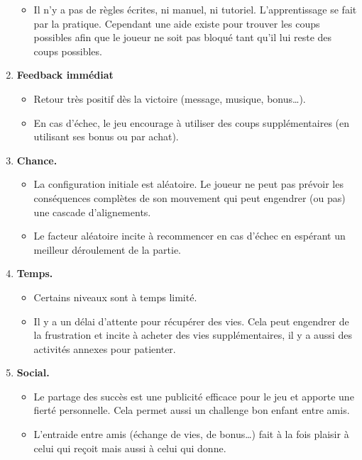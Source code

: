 \documentclass[11pt,class=report,crop=false]{standalone}
\begin{document}
\begin{enumerate}
\begin{itemize}
		\item Il n'y a pas de règles écrites, ni manuel, ni tutoriel. L'apprentissage se fait par la pratique. Cependant une aide existe pour trouver les coups possibles  afin que le joueur ne soit pas bloqué tant qu'il lui reste des coups possibles.
	\end{itemize}

    		
    \item \textbf{Feedback immédiat}    
    \begin{itemize}
    	\item Retour très positif dès la victoire (message, musique, bonus\ldots).
    	\item En cas d'échec, le jeu encourage à utiliser des coups supplémentaires (en utilisant ses bonus ou par achat).
    \end{itemize}

    		
    \item \textbf{Chance.}    
    \begin{itemize}
    	\item La configuration initiale est aléatoire. Le joueur ne peut pas prévoir les conséquences complètes de son mouvement qui peut engendrer (ou pas) une cascade d'alignements.
    	
    	\item Le facteur aléatoire incite à recommencer en cas d'échec en espérant un meilleur déroulement de la partie.
    \end{itemize}

    		
    \item \textbf{Temps.}
    
    \begin{itemize}
    	\item Certains niveaux sont à temps limité.    	
    	
    	\item Il y a un délai d'attente pour récupérer des vies. Cela peut engendrer de la frustration et incite à acheter des vies supplémentaires, il y a aussi des activités annexes pour patienter.
    \end{itemize}

    \item \textbf{Social.}
	\begin{itemize}
		\item Le partage des succès est une publicité efficace pour le jeu et apporte une fierté personnelle. Cela permet aussi un challenge bon enfant entre amis. 
		
		\item L'entraide entre amis (échange de vies, de bonus\ldots) fait à la fois plaisir à celui qui reçoit mais aussi à celui qui donne.
	\end{itemize}

\end{enumerate}
\end{document}
